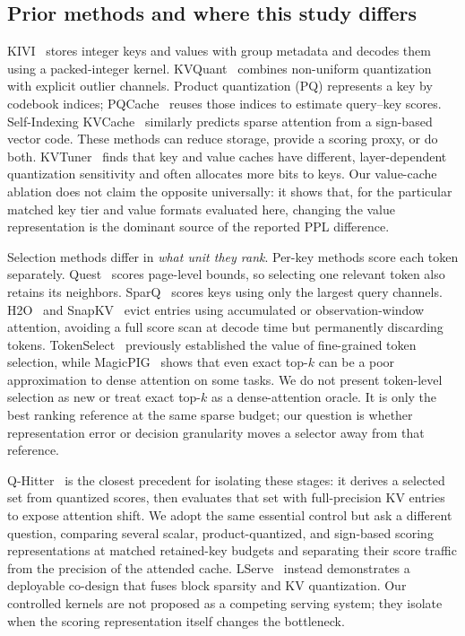 \documentclass[sigplan,anonymous,review,nonacm]{acmart}
\begin{document}
\subsection{Prior methods and where this study differs}
KIVI~\cite{liu2024kivi} stores integer keys and values with group metadata and decodes
them using a packed-integer kernel. KVQuant~\cite{hooper2024kvquant} combines
non-uniform quantization with explicit outlier channels. Product quantization (PQ)
represents a key by codebook indices; PQCache~\cite{zhang2025pqcache} reuses those
indices to estimate query--key scores. Self-Indexing KVCache~\cite{yang2026selfindexing}
similarly predicts sparse attention from a sign-based vector code. These methods can
reduce storage, provide a scoring proxy, or do both. KVTuner~\cite{li2025kvtuner}
finds that key and value caches have different, layer-dependent quantization
sensitivity and often allocates more bits to keys. Our value-cache ablation does not
claim the opposite universally: it shows that, for the particular matched key tier
and value formats evaluated here, changing the value representation is the dominant
source of the reported PPL difference.

Selection methods differ in \emph{what unit they rank}. Per-key methods score each
token separately. Quest~\cite{tang2024quest} scores page-level bounds, so selecting
one relevant token also retains its neighbors. SparQ~\cite{ribar2024sparq} scores
keys using only the largest query channels. H2O~\cite{zhang2023h2o} and
SnapKV~\cite{li2024snapkv} evict entries using accumulated or observation-window
attention, avoiding a full score scan at decode time but permanently discarding
tokens. TokenSelect~\cite{wu2025tokenselect} previously established the value of
fine-grained token selection, while MagicPIG~\cite{chen2025magicpig} shows that even
exact top-$k$ can be a poor approximation to dense attention on some tasks. We do not
present token-level selection as new or treat exact top-$k$ as a dense-attention
oracle. It is only the best ranking reference at the same sparse budget; our question
is whether representation error or decision granularity moves a selector away from
that reference.

Q-Hitter~\cite{zhang2024qhitter} is the closest precedent for isolating these stages:
it derives a selected set from quantized scores, then evaluates that set with
full-precision KV entries to expose attention shift. We adopt the same essential
control but ask a different question, comparing several scalar, product-quantized,
and sign-based scoring representations at matched retained-key budgets and separating
their score traffic from the precision of the attended cache. LServe~\cite{yang2025lserve}
instead demonstrates a deployable co-design that fuses block sparsity and KV
quantization. Our controlled kernels are not proposed as a competing serving system;
they isolate when the scoring representation itself changes the bottleneck.
\end{document}
